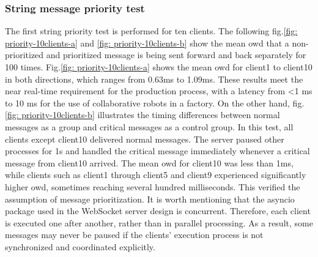 \subsubsection{String message priority test}
The first string priority test is performed for ten clients. The following 
fig.\ref{fig: priority-10clients-a} and \ref{fig: priority-10clients-b} show the 
mean \gls{owd} that a non-prioritized and prioritized message is being sent forward and 
back separately for 100 times.
Fig.\ref{fig: priority-10clients-a} shows the mean \gls{owd} for client1 to client10 in both 
directions, which ranges from 0.63ms to 1.09ms. These results meet the near real-time 
requirement for the production process\cite{li_5g_2018}, with a latency from <1 ms to 10 ms 
for the use of collaborative robots in a factory. 
On the other hand, fig.\ref{fig: priority-10clients-b} 
illustrates the timing differences between normal messages as a group and critical messages 
as a control group. In this test, all clients except client10 delivered normal messages. 
The server paused other processes for 1s and handled the critical message immediately 
whenever a critical message from client10 arrived. The mean \gls{owd} for client10 was less 
than 1ms, while clients such as client1 through client5 and client9 experienced 
significantly higher \gls{owd}, sometimes reaching several hundred milliseconds. This 
verified the assumption of message prioritization. It is worth mentioning that the 
asyncio package used in the WebSocket server design is concurrent. Therefore, each 
client is executed one after another, rather than in parallel processing. As a result, 
some messages may never be paused if the clients' execution process is not synchronized 
and coordinated explicitly.

